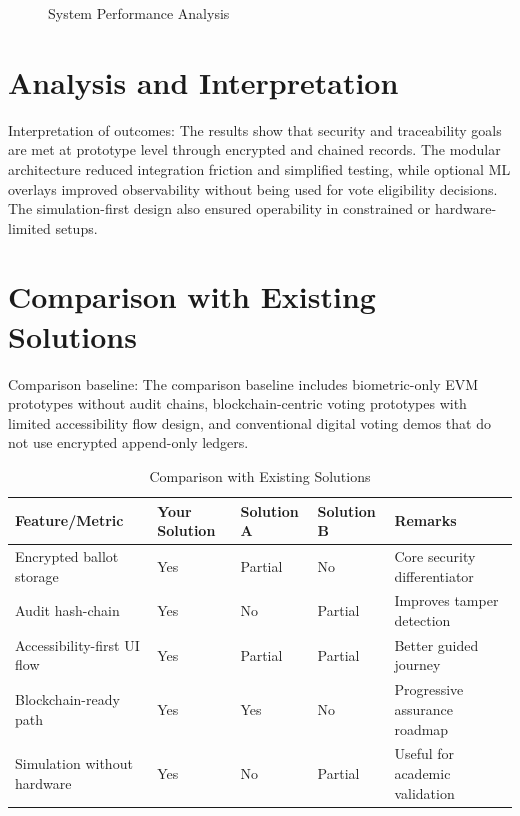 \begin{figure}[htbp]
\centering
{}
\caption{System Performance Analysis}
\end{figure}

\section{Analysis and Interpretation}
Interpretation of outcomes:
The results show that security and traceability goals are met at prototype level through encrypted and chained records. The modular architecture reduced integration friction and simplified testing, while optional ML overlays improved observability without being used for vote eligibility decisions. The simulation-first design also ensured operability in constrained or hardware-limited setups.

\section{Comparison with Existing Solutions}
Comparison baseline:
The comparison baseline includes biometric-only EVM prototypes without audit chains, blockchain-centric voting prototypes with limited accessibility flow design, and conventional digital voting demos that do not use encrypted append-only ledgers.

\begin{table}[htbp]
\centering
\caption{Comparison with Existing Solutions}
\begin{tabular}{p{}p{}p{}p{}p{}}
\toprule
Feature/Metric & Your Solution & Solution A & Solution B & Remarks \\
\midrule
Encrypted ballot storage & Yes & Partial & No & Core security differentiator \\
Audit hash-chain & Yes & No & Partial & Improves tamper detection \\
Accessibility-first UI flow & Yes & Partial & Partial & Better guided journey \\
Blockchain-ready path & Yes & Yes & No & Progressive assurance roadmap \\
Simulation without hardware & Yes & No & Partial & Useful for academic validation \\
\bottomrule
\end{tabular}
\end{table}

\clearpage
